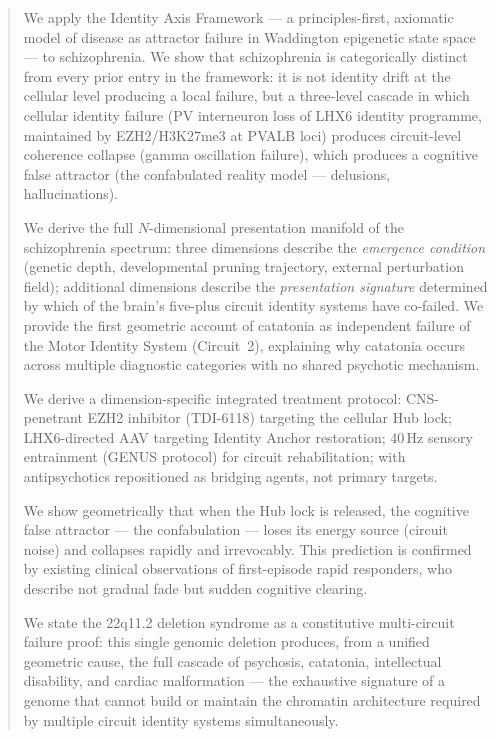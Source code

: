 \documentclass[12pt,a4paper]{article}
\begin{document}
\vspace{1em}

\begin{abstract}
\noindent
We apply the Identity Axis Framework --- a principles-first,
axiomatic model of disease as attractor failure in Waddington
epigenetic state space --- to schizophrenia. We show that
schizophrenia is categorically distinct from every prior entry
in the framework: it is not identity drift at the cellular
level producing a local failure, but a three-level cascade in
which cellular identity failure (PV interneuron loss of LHX6
identity programme, maintained by EZH2/H3K27me3 at PVALB loci)
produces circuit-level coherence collapse (gamma oscillation
failure), which produces a cognitive false attractor (the
confabulated reality model --- delusions, hallucinations).

We derive the full $N$-dimensional presentation manifold
of the schizophrenia spectrum: three dimensions describe the
\emph{emergence condition} (genetic depth, developmental
pruning trajectory, external perturbation field); additional
dimensions describe the \emph{presentation signature} determined
by which of the brain's five-plus circuit identity systems
have co-failed. We provide the first geometric account of
catatonia as independent failure of the Motor Identity System
(Circuit~2), explaining why catatonia occurs across multiple
diagnostic categories with no shared psychotic mechanism.

We derive a dimension-specific integrated treatment protocol:
CNS-penetrant EZH2 inhibitor (TDI-6118) targeting the cellular
Hub lock; LHX6-directed AAV targeting Identity Anchor
restoration; 40\,Hz sensory entrainment (GENUS protocol) for
circuit rehabilitation; with antipsychotics repositioned as
bridging agents, not primary targets.

We show geometrically that when the Hub lock is released, the
cognitive false attractor --- the confabulation --- loses its
energy source (circuit noise) and collapses rapidly and
irrevocably. This prediction is confirmed by existing clinical
observations of first-episode rapid responders, who describe
not gradual fade but sudden cognitive clearing.

We state the 22q11.2 deletion syndrome as a constitutive
multi-circuit failure proof: this single genomic deletion
produces, from a unified geometric cause, the full cascade of
psychosis, catatonia, intellectual disability, and cardiac
malformation --- the exhaustive signature of a genome that
cannot build or maintain the chromatin architecture required
by multiple circuit identity systems simultaneously.


\end{abstract}
\end{document}
